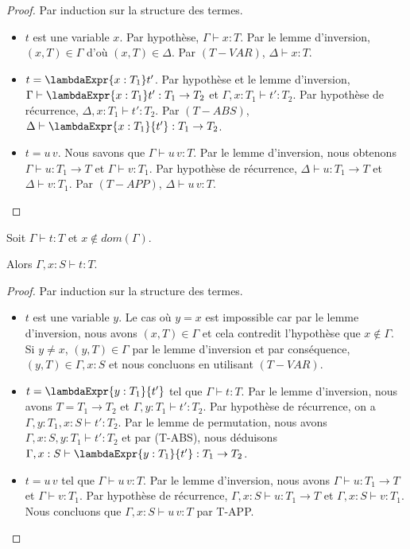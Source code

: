 \begin{proof}
  Par induction sur la structure des termes.
  \begin{itemize}
  \item $t$ est une variable $x$. Par hypothèse, $\Gamma \vdash x : T$. Par le lemme
    d'inversion, $(x, T) \in \Gamma$ d'où $(x, T) \in \Delta$. Par $(T-VAR)$,
    $\Delta \vdash x : T$.
  \item $t = \lambdaExpr{x : T_{1}} t'$. Par hypothèse et le lemme d'inversion,
    $\Gamma \vdash \lambdaExpr{x : T_{1}} t' : T_{1} \rightarrow T_{2}$ et
    $\Gamma, x : T_{1} \vdash t' : T_{2}$. Par hypothèse de récurrence, $\Delta,
    x : T_{1} \vdash t' : T_{2}$. Par $(T-ABS)$, $\Delta \vdash \lambdaExpr{x :
      T_{1}}{t'} : T_{1} \rightarrow T_{2}$.
  \item $t = u \, v$. Nous savons que $\Gamma \vdash u \, v : T$. Par le lemme
    d'inversion, nous obtenons $\Gamma \vdash u : T_{1} \rightarrow T$ et
    $\Gamma \vdash v : T_{1}$. Par hypothèse de récurrence, $\Delta \vdash u :
    T_{1} \rightarrow T$ et $\Delta \vdash v : T_{1}$. Par $(T-APP)$, $\Delta
    \vdash u \, v : T$.
  \end{itemize}
\end{proof}

\begin{lemma} [d'affaiblissement]
  Soit $\Gamma \vdash t : T$ et $x \notin dom(\Gamma)$.

  Alors $\Gamma, x : S \vdash t : T$.
\end{lemma}

\begin{proof}
  Par induction sur la structure des termes.
  \begin{itemize}
  \item $t$ est une variable $y$. Le cas où $y = x$ est impossible car par le
    lemme d'inversion, nous avons $(x, T) \in \Gamma$ et cela contredit
    l'hypothèse que $x \notin \Gamma$. Si $y \neq x$, $(y, T) \in \Gamma$ par le
    lemme d'inversion et par conséquence, $(y, T) \in \Gamma, x : S$ et nous
    concluons en utilisant $(T-VAR)$.
  \item $t = \lambdaExpr{y : T_{1}}{t'}$ tel que $\Gamma \vdash t : T$. Par le
    lemme d'inversion, nous avons $T = T_{1} \rightarrow T_{2}$ et $\Gamma, y :
    T_{1} \vdash t' : T_{2}$. Par hypothèse de récurrence, on a $\Gamma, y :
    T_{1}, x : S \vdash t' : T_{2}$. Par le lemme de permutation, nous avons
    $\Gamma, x : S, y : T_{1} \vdash t' : T_{2}$ et par (T-ABS), nous déduisons
    $\Gamma, x : S \vdash \lambdaExpr{y : T_{1}}{t'} : T_{1} \rightarrow T_{2}$.
    \item $t = u \, v$ tel que $\Gamma \vdash u \, v : T$. Par le lemme
      d'inversion, nous avons $\Gamma \vdash u : T_{1} \rightarrow T$ et $\Gamma
      \vdash v : T_{1}$. Par hypothèse de récurrence, $\Gamma, x : S \vdash u :
      T_{1} \rightarrow T$ et $\Gamma, x : S \vdash v : T_{1}$. Nous concluons
      que $\Gamma, x : S \vdash u \, v : T$ par T-APP.
  \end{itemize}
\end{proof}

